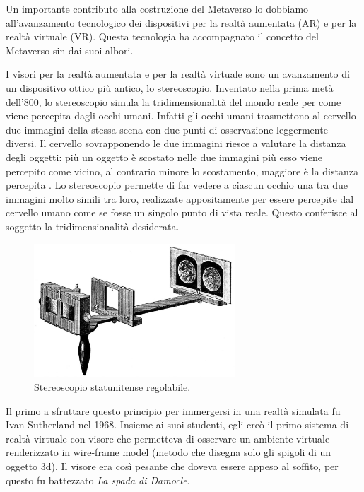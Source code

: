         Un importante contributo alla costruzione del Metaverso lo dobbiamo all'avanzamento tecnologico dei dispositivi per la realtà aumentata (AR) e per la realtà virtuale (VR).
        Questa tecnologia ha accompagnato il concetto del Metaverso sin dai suoi albori.

        I visori per la realtà aumentata e per la realtà virtuale sono un avanzamento di un dispositivo ottico più antico, lo stereoscopio. 
        Inventato nella prima metà dell'800, lo stereoscopio simula la tridimensionalità del mondo reale per come viene percepita dagli occhi umani. 
        Infatti gli occhi umani trasmettono al cervello due immagini della stessa scena con due punti di osservazione leggermente diversi.
        Il cervello sovrapponendo le due immagini riesce a valutare la distanza degli oggetti: più un oggetto è scostato nelle due immagini più esso viene percepito come vicino, al contrario minore lo scostamento, maggiore è la distanza percepita \cite{Stereoscopia}.
        Lo stereoscopio permette di far vedere a ciascun occhio una tra due immagini molto simili tra loro, realizzate appositamente per essere percepite dal cervello umano come se fosse un singolo punto di vista reale.
        Questo conferisce al soggetto la tridimensionalità desiderata.

        \begin{figure}[!ht]
            \centering
            \includegraphics[height=5cm]{figure/Stereoscopia.jpg}
            \caption{Stereoscopio statunitense regolabile.}
        \end{figure}

        Il primo a sfruttare questo principio per immergersi in una realtà simulata fu Ivan Sutherland nel 1968.
        Insieme ai suoi studenti, egli creò il primo sistema di realtà virtuale con visore che permetteva di osservare un ambiente virtuale renderizzato in wire-frame model (metodo che disegna solo gli spigoli di un oggetto 3d).
        Il visore era così pesante che doveva essere appeso al soffito, per questo fu battezzato \textit{La spada di Damocle}.

